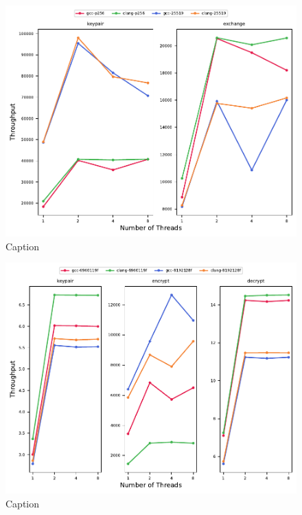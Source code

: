 \begin{figure}
    \centering
    \includegraphics{chapters/results/throughput/IBM Community Cloud_ecdh.pdf}
    \caption{Caption}
    \label{figure:results:throughput:ecdh-ibm-community-cloud}
\end{figure}

\begin{figure}
    \centering
    \includegraphics{chapters/results/throughput/IBM Community Cloud_mceliece.pdf}
    \caption{Caption}
    \label{figure:results:throughput:ibm-community-cloud}
\end{figure}

